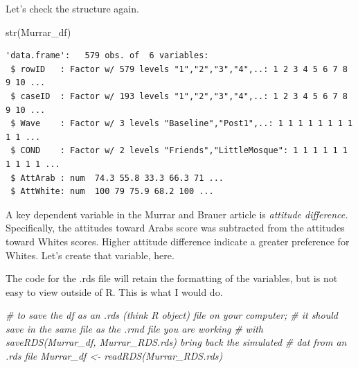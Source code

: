 \documentclass[
  11pt,
]{book}
\newenvironment{Shaded}{\begin{snugshade}}{\end{snugshade}}
\newcommand{\CommentTok}[1]{\textcolor[rgb]{0.56,0.35,0.01}{\textit{#1}}}
\newcommand{\FunctionTok}[1]{\textcolor[rgb]{0.00,0.00,0.00}{#1}}
\newcommand{\NormalTok}[1]{#1}
\newcommand{\OtherTok}[1]{\textcolor[rgb]{0.56,0.35,0.01}{#1}}
\newcommand{\SpecialCharTok}[1]{\textcolor[rgb]{0.00,0.00,0.00}{#1}}
\begin{document}
Let's check the structure again.

\begin{Shaded}
\begin{Highlighting}[]
\FunctionTok{str}\NormalTok{(Murrar\_df)}
\end{Highlighting}
\end{Shaded}

\begin{verbatim}
'data.frame':   579 obs. of  6 variables:
 $ rowID   : Factor w/ 579 levels "1","2","3","4",..: 1 2 3 4 5 6 7 8 9 10 ...
 $ caseID  : Factor w/ 193 levels "1","2","3","4",..: 1 2 3 4 5 6 7 8 9 10 ...
 $ Wave    : Factor w/ 3 levels "Baseline","Post1",..: 1 1 1 1 1 1 1 1 1 1 ...
 $ COND    : Factor w/ 2 levels "Friends","LittleMosque": 1 1 1 1 1 1 1 1 1 1 ...
 $ AttArab : num  74.3 55.8 33.3 66.3 71 ...
 $ AttWhite: num  100 79 75.9 68.2 100 ...
\end{verbatim}

A key dependent variable in the Murrar and Brauer \citep{murrar_entertainment-education_2018} article is \emph{attitude difference.} Specifically, the attitudes toward Arabs score was subtracted from the attitudes toward Whites scores. Higher attitude difference indicate a greater preference for Whites. Let's create that variable, here.

\begin{Shaded}
\end{Shaded}

The code for the .rds file will retain the formatting of the variables, but is not easy to view outside of R. This is what I would do.

\begin{Shaded}
\begin{Highlighting}[]
\CommentTok{\# to save the df as an .rds (think \textquotesingle{}R object\textquotesingle{}) file on your computer;}
\CommentTok{\# it should save in the same file as the .rmd file you are working}
\CommentTok{\# with saveRDS(Murrar\_df, \textquotesingle{}Murrar\_RDS.rds\textquotesingle{}) bring back the simulated}
\CommentTok{\# dat from an .rds file Murrar\_df \textless{}{-} readRDS(\textquotesingle{}Murrar\_RDS.rds\textquotesingle{})}
\end{Highlighting}
\end{Shaded}
\end{document}
